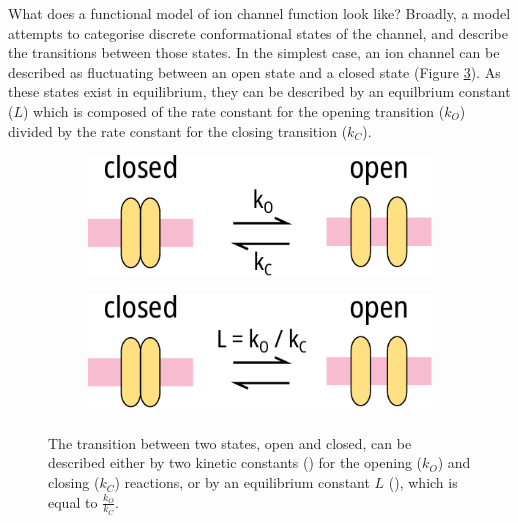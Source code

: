 What does a functional model of ion channel function look like?
Broadly, a model attempts to categorise discrete conformational states of the channel, and describe the transitions between those states.
In the simplest case, an ion channel can be described as fluctuating between an open state and a closed state (Figure \ref{ch4fig:simple_model_diagram}).
As these states exist in equilibrium, they can be described by an equilbrium constant ($L$) which is composed of the rate constant for the opening transition ($k_O$) divided by the rate constant for the closing transition ($k_C$).

\begin{figure}[h]
	\centering
	\begin{subfigure}[t]{0.45\textwidth}
		\caption{}\label{ch4fig:simple_diag_1}
		\centering
		\includegraphics[width=\textwidth]{model_introduction_diagrams.pdf}
	\end{subfigure}
	\hfill
	\begin{subfigure}[t]{0.45\textwidth}
		\caption{}\label{ch4fig:simple_diag_2}
		\centering
		\includegraphics[width=\textwidth]{model_introduction_diagrams_2.pdf}
	\end{subfigure}
	\caption[Simple ion channel model]{
	The transition between two states, open and closed, can be described either by two kinetic constants () for the opening ($k_O$) and closing ($k_C$) reactions, or by an equilibrium constant $L$ (), which is equal to $\frac{k_O}{k_C}$.
	}\label{ch4fig:simple_model_diagram}
\end{figure}

